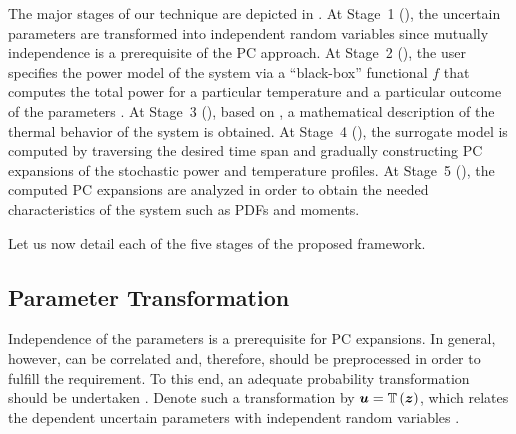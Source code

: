 The major stages of our technique are depicted in . At
Stage~1 (), the uncertain parameters \vu
are transformed into independent random variables \vz since mutually
independence is a prerequisite of the \ac{PC} approach. At Stage~2
(), the user specifies the power model of the system
via a ``black-box'' functional $f$ that computes the total power \vp for a
particular temperature \vq and a particular outcome of the parameters \vu. At
Stage~3 (), based on
, a mathematical description of the thermal
behavior of the system is obtained. At Stage~4 (),
the surrogate model is computed by traversing the desired time span and
gradually constructing \ac{PC} expansions of the stochastic power and
temperature profiles. At Stage~5 (), the computed
\ac{PC} expansions are analyzed in order to obtain the needed characteristics of
the system such as \acp{PDF} and moments.

Let us now detail each of the five stages of the proposed framework.

\subsection{Parameter Transformation}

Independence of the parameters is a prerequisite for PC expansions. In general,
however, \vu can be correlated and, therefore, should be preprocessed in order
to fulfill the requirement. To this end, an adequate probability transformation
should be undertaken \cite{eldred2008}. Denote such a transformation by $\boldsymbol{u} =
\mathbb{T}\left(\boldsymbol{z}\right)$, which relates the \nu dependent uncertain parameters \vu with
\nz independent random variables \vz.


